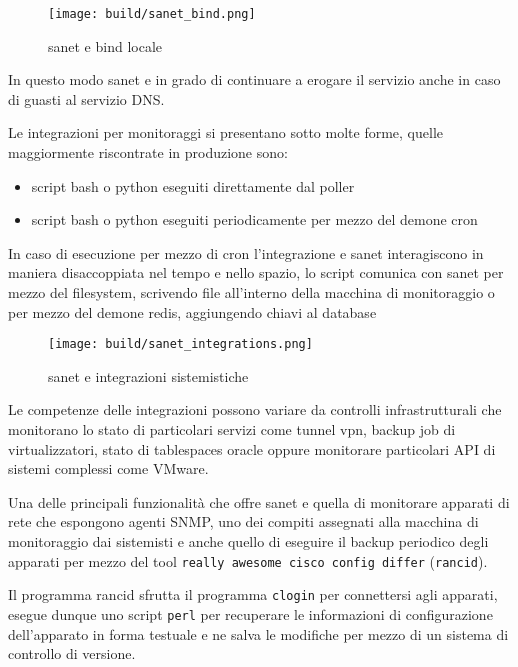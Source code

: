 \documentclass[12pt,a4paper,twoside,openright]{book}
\begin{document}
\begin{figure}[H]
    \centering
    \texttt{[image: build/sanet\_bind.png]}
    \caption{sanet e bind locale}
    \label{fig:enter-label}
\end{figure}

In questo modo sanet e in grado di continuare a erogare il servizio anche in caso di guasti al servizio DNS.

Le integrazioni per monitoraggi si presentano sotto molte forme, quelle maggiormente riscontrate in produzione sono:

\begin{itemize}
  \item{script bash o python eseguiti direttamente dal poller}
  \item{script bash o python eseguiti periodicamente per mezzo del demone cron}
\end{itemize}

In caso di esecuzione per mezzo di cron l'integrazione e sanet interagiscono in maniera disaccoppiata nel tempo e nello spazio, lo script comunica con sanet per mezzo del filesystem, scrivendo file all'interno della macchina di monitoraggio o per mezzo del demone redis, aggiungendo chiavi al database

\begin{figure}[H]
    \centering
    \texttt{[image: build/sanet\_integrations.png]}
    \caption{sanet e integrazioni sistemistiche}
    \label{fig:enter-label}
\end{figure}

Le competenze delle integrazioni possono variare da controlli infrastrutturali che monitorano lo stato di particolari servizi come tunnel vpn, backup job di virtualizzatori, stato di tablespaces oracle oppure monitorare particolari API di sistemi complessi come VMware.

Una delle principali funzionalità che offre sanet e quella di monitorare apparati di rete che espongono agenti SNMP, uno dei compiti assegnati alla macchina di monitoraggio dai sistemisti e anche quello di eseguire il backup periodico degli apparati per mezzo del tool \verb|really awesome cisco config differ| (\verb|rancid|).

Il programma rancid sfrutta il programma \verb|clogin| per connettersi agli apparati, esegue dunque uno script \verb|perl| per recuperare le informazioni di configurazione dell'apparato in forma testuale e ne salva le modifiche per mezzo di un sistema di controllo di versione.
\end{document}
